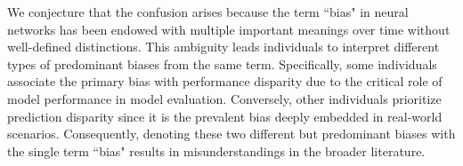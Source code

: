 We conjecture that the confusion arises because the term ``bias" in neural networks has been endowed with multiple important meanings over time without well-defined distinctions. This ambiguity leads individuals to interpret different types of predominant biases from the same term.
Specifically, some individuals associate the primary bias with performance disparity due to the critical role of model performance in model evaluation.
Conversely, other individuals prioritize prediction disparity since it is the prevalent bias deeply embedded in real-world scenarios.
Consequently, denoting these two different but predominant biases with the single term ``bias" results in misunderstandings in the broader literature.

















